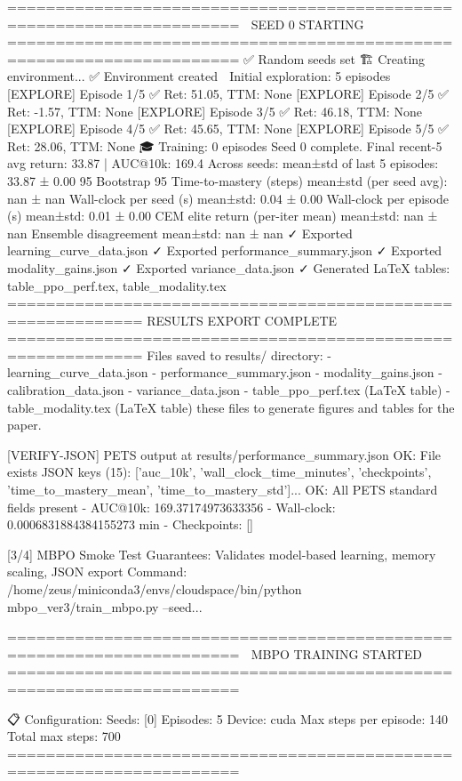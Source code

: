 ======================================================================
📍 SEED 0 STARTING
======================================================================
✅ Random seeds set
🏗️  Creating environment...
✅ Environment created
🏁 Initial exploration: 5 episodes
   [EXPLORE] Episode 1/5 ✅ Ret: 51.05, TTM: None
   [EXPLORE] Episode 2/5 ✅ Ret: -1.57, TTM: None
   [EXPLORE] Episode 3/5 ✅ Ret: 46.18, TTM: None
   [EXPLORE] Episode 4/5 ✅ Ret: 45.65, TTM: None
   [EXPLORE] Episode 5/5 ✅ Ret: 28.06, TTM: None
🎓 Training: 0 episodes
Seed 0 complete. Final recent-5 avg return: 33.87 | AUC@10k: 169.4
Across seeds: mean±std of last 5 episodes: 33.87 ± 0.00
95%
Bootstrap 95%
Time-to-mastery (steps) mean±std (per seed avg): nan ± nan
Wall-clock per seed (s) mean±std: 0.04 ± 0.00
Wall-clock per episode (s) mean±std: 0.01 ± 0.00
CEM elite return (per-iter mean) mean±std: nan ± nan
Ensemble disagreement mean±std: nan ± nan
✓ Exported learning_curve_data.json
✓ Exported performance_summary.json
✓ Exported modality_gains.json
✓ Exported variance_data.json
✓ Generated LaTeX tables: table_ppo_perf.tex, table_modality.tex
\n============================================================
RESULTS EXPORT COMPLETE
============================================================
Files saved to results/ directory:
  - learning_curve_data.json
  - performance_summary.json
  - modality_gains.json
  - calibration_data.json
  - variance_data.json
  - table_ppo_perf.tex (LaTeX table)
  - table_modality.tex (LaTeX table)
\nUse these files to generate figures and tables for the paper.

[VERIFY-JSON] PETS output at results/performance_summary.json
   OK: File exists
   JSON keys (15): ['auc_10k', 'wall_clock_time_minutes', 'checkpoints', 'time_to_mastery_mean', 'time_to_mastery_std']...
   OK: All PETS standard fields present
   - AUC@10k: 169.37174973633356
   - Wall-clock: 0.0006831884384155273 min
   - Checkpoints: []

[3/4] MBPO Smoke Test
   Guarantees: Validates model-based learning, memory scaling, JSON export
   Command: /home/zeus/miniconda3/envs/cloudspace/bin/python mbpo_ver3/train_mbpo.py --seed...

======================================================================
🚀 MBPO TRAINING STARTED
======================================================================

📋 Configuration:
   Seeds: [0]
   Episodes: 5
   Device: cuda
   Max steps per episode: 140
   Total max steps: 700
======================================================================

